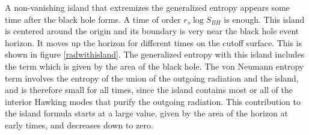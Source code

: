 A non-vanishing island that extremizes the generalized entropy appears some time after the black hole forms. A time of order $r_s \log S_{BH}$ is enough. This island is centered around the origin and its boundary is very near the black hole event horizon. It moves up the horizon for different times on the cutoff surface. This is shown in figure \ref{radwithisland}. The generalized entropy with this island includes the term which is given by the area of the black hole. The von Neumann entropy term involves the entropy of the union of the outgoing radiation and the island, and is therefore small for all times, since the island contains most or all of the interior Hawking modes that purify the outgoing radiation. This contribution to the island formula starts at a large value, given by the area of the horizon at early times, and decreases down to zero.

